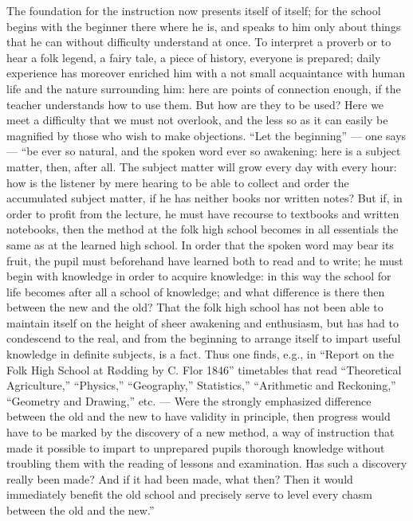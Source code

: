 \documentclass[12pt,a4paper,openany]{book}
\newcommand{\opage}[1]{\marginnote{\footnotesize\textit{[#1]}}}
\begin{document}
The foundation for the instruction now presents itself of itself;
for the school begins with the beginner there where he
is, and speaks to him only about things that he can without difficulty
understand at once. To interpret a proverb or
to hear a folk legend, a fairy tale, a piece of history, everyone
is prepared; daily experience has moreover enriched
him with a not small acquaintance with human life
and the nature surrounding him: here are points of connection
enough, if the teacher understands how to use them.
But how are they to be used? Here we meet a difficulty
that we must not overlook, and the less so
as it can easily be magnified by those who wish to
make objections. ``Let the beginning'' --- one says ---
``be ever so natural, and the spoken word ever so
awakening: here is a subject matter, then, after all. The subject matter will grow
every day with every hour: how is the listener
by mere hearing to be able to collect and order the accumulated
subject matter, if he has neither books nor written
notes? But if, in order to profit from
the lecture, he must have recourse to textbooks and written notebooks,
then the method at the folk high school becomes in all
essentials the same as at the learned high school. In order that
the spoken word may bear its fruit, the pupil must
beforehand have learned both to read and to write;
he must begin with knowledge in order to acquire
knowledge: in this way the school for life becomes after all
a school of knowledge; and what difference is there then
\setcounter{footnote}{0}%
\opage{419}between the new and the old? That the folk high school has not
been able to maintain itself on the height of sheer awakening
and enthusiasm, but has had to condescend to the
real, and from the beginning to arrange itself to impart
useful knowledge in definite subjects, is a fact.
Thus one finds, e.g., in ``Report on the Folk High School
at Rødding by C. Flor 1846'' timetables
that read ``Theoretical Agriculture,'' ``Physics,'' ``Geography,''
Statistics,'' ``Arithmetic and Reckoning,'' ``Geometry
and Drawing,'' etc. --- Were the strongly emphasized difference
between the old and the new to have validity in principle,
then progress would have to be marked by
the discovery of a new method, a way of instruction
that made it possible to impart to unprepared pupils
thorough knowledge without troubling them with the reading of lessons
and examination. Has such a discovery really been
made? And if it had been made, what then? Then it would
immediately benefit the old school and precisely
serve to level every chasm between the old and
the new.''
\end{document}
